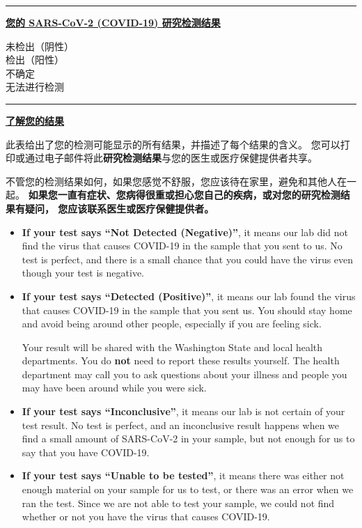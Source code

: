 \documentclass[10pt]{article}
\newcommand{\PageLine}{\rule{\textwidth}{0.25mm}}
\begin{document}
\bigskip
\PageLine

\large \underline{\textbf{您的 SARS-CoV-2 (COVID-19) 研究检测结果}}

未检出（阴性）\\
检出（阳性）\\
不确定\\
无法进行检测\\

\PageLine
\bigskip

\large \underline{\textbf{了解您的结果}}

此表给出了您的检测可能显示的所有结果，并描述了每个结果的含义。
您可以打印或通过电子邮件将此\textbf{研究检测结果}与您的医生或医疗保健提供者共享。

不管您的检测结果如何，如果您感觉不舒服，您应该待在家里，避免和其他人在一起。
\textbf{如果您一直有症状、您病得很重或担心您自己的疾病，或对您的研究检测结果有疑问，
您应该联系医生或医疗保健提供者。}

\begin{itemize}


\item

  \textbf{If your test says ``Not Detected (Negative)''}, it means our lab did not find the
  virus that causes COVID-19 in the sample that you sent to us. No test is
  perfect, and there is a small chance that you could have the virus even though
  your test is negative.

\item

  \textbf{If your test says ``Detected (Positive)''}, it means our
  lab found the virus that causes COVID-19 in the sample that you sent us. You
  should stay home and avoid being around other people, especially if you are
  feeling sick.

  Your result will be shared with the Washington State and local health
  departments. You do \textbf{not} need to report these results yourself. The
  health department may call you to ask questions about your illness and people
  you may have been around while you were sick.

\item

  \textbf{If your test says ``Inconclusive''}, it means our lab is not certain
  of your test result. No test is perfect, and an inconclusive result happens
  when we find a small amount of SARS-CoV-2 in your sample, but not enough for
  us to say that you have COVID-19.

\item

  \textbf{If your test says ``Unable to be tested''}, it means there was either
  not enough material on your sample for us to test, or there was an error when
  we ran the test. Since we are not able to test your sample, we could not find
  whether or not you have the virus that causes COVID-19.

\end{itemize}
\end{document}
